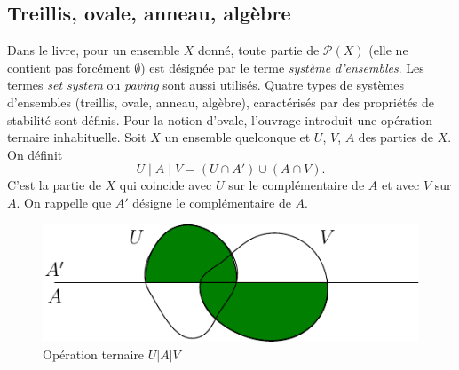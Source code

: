 \subsection{Treillis, ovale, anneau, algèbre}
Dans le livre, pour un ensemble $X$ donné, toute partie de $\mathcal{P}(X)$ (elle ne contient pas forcément $\emptyset$) est désignée par le terme \emph{système d'ensembles}. Les termes \emph{set system} ou \emph{paving} sont aussi utilisés. Quatre types de systèmes d'ensembles (treillis, ovale, anneau, algèbre), caractérisés par des propriétés de stabilité sont définis. Pour la notion d'ovale, l'ouvrage introduit une opération ternaire inhabituelle.\newline
Soit $X$ un ensemble quelconque et $U$, $V$, $A$ des parties de $X$. On définit
\begin{displaymath}
  U \mid A \mid V = (U \cap A') \cup ( A \cap V).
\end{displaymath}
C'est la partie de $X$ qui coincide avec $U$ sur le complémentaire de $A$ et avec $V$ sur $A$.
On rappelle que $A'$ désigne le complémentaire de $A$.

\begin{figure}[ht]
 \centering
 \includegraphics{NotesKonig_OpTern.pdf}
 \caption{Opération ternaire $U | A | V$}
 \label{fig:OpTern}
\end{figure}


